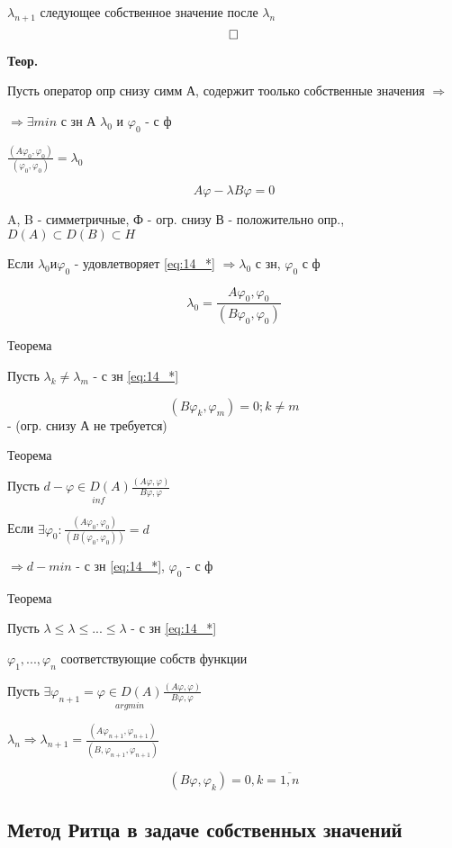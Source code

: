 $ \lambda_{n+1}$ следующее собственное значение после $ \lambda_n $
\[ \hfill \square \]

\textbf{Теор.}

Пусть оператор опр снизу симм А, содержит тоолько собственные значения  $ \Rightarrow $

$ \Rightarrow \exists min  $ с зн А $ \lambda_0 $ и $ \varphi_0  $ - с ф

$ \frac{(A\varphi_0, \varphi_0)}{(\varphi_0, \varphi_0)} = \lambda_0 $

\[ A \varphi - \lambda B \varphi = 0 \label{eq:14_*} \]

A, B - симметричные, Ф - огр. снизу
В - положительно опр., $  D(A) \subset D(B) \subset H $

Если $ \lambda_0 и \varphi_0 $ - удовлетворяет \ref{eq:14_*} $ \Rightarrow \lambda_0 $ с зн, $ \varphi_0 $ с ф

\[ \lambda_0 = \frac{A \varphi_0, \varphi_0}{(B \varphi_0, \varphi_0)} \]

Теорема

Пусть $ \lambda_k \neq \lambda_m  $ - с зн \ref{eq:14_*}

\[ (B \varphi_k, \varphi_m) = 0; k \neq m  \] - (огр. снизу А не требуется)


Теорема

Пусть $ d - \underset{inf}{\varphi \in D(A)} \frac{(A \varphi, \varphi)}{B \varphi, \varphi} $

Если $ \exists \varphi_0: \frac{(A \varphi_0, \varphi_0)}{(B(\varphi_0, \varphi_0))} = d $

$ \Rightarrow d - min $ - с зн \ref{eq:14_*}, $ \varphi_0 $ - с ф

Теорема

Пусть $ \lambda \leq \lambda \leq ... \leq \lambda $ - с зн \ref{eq:14_*}

$ \varphi_1, ... , \varphi_n $ соответствующие собств функции

Пусть $ \exists \varphi_{n+1} = \underset{argmin}{\varphi \in D(A)}\frac{(A \varphi, \varphi)}{B \varphi, \varphi} $

$ \lambda_n \Rightarrow \lambda_{n+1} = \frac{(A \varphi_{n+1}, \varphi_{n+1})}{(B, \varphi_{n+1}, \varphi_{n+1})} $

\[ (B\varphi, \varphi_k) = 0, k = \overline{1, n} \]

\subsection{Метод Ритца в задаче собственных значений}

